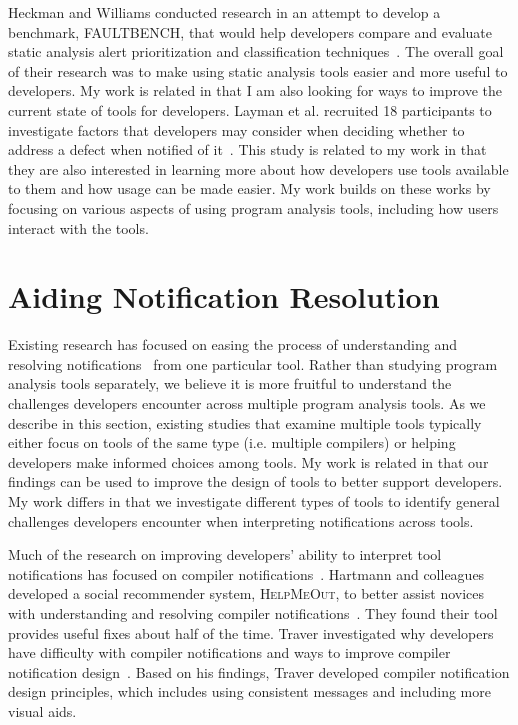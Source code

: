 Heckman and Williams conducted research in an attempt to develop a benchmark,
FAULTBENCH, that would help developers compare and evaluate static analysis
alert prioritization and classification techniques~\cite{Heckman:2008:Faultbench}. 
The overall goal of their research was to make using static analysis tools easier and more useful to developers.
My work is related in that I am also looking for ways to improve the current state of tools for developers. 
Layman et al. recruited 18 participants to investigate factors that developers may consider when deciding whether to
address a defect when notified of it~\cite{Layman:2007:FaultFix}. This study
is related to my work in that they are also interested in learning more about how developers use tools available to them 
and how usage can be made easier.  My work builds on these works by focusing on various
aspects of using program analysis tools, including how users interact with the
tools.

\section{Aiding Notification Resolution}

Existing research has focused on easing the process of understanding and resolving notifications~\cite{Hartmann:2010:Suggestions,Mucslu:2012:Speculative,pham2015automatically,fritz2014developers} from one particular tool.
Rather than studying program analysis tools separately, we believe it is more fruitful to understand the challenges developers encounter across multiple program analysis tools.
As we describe in this section,
existing studies that examine multiple tools typically either focus on tools of the same type (i.e. multiple compilers) 
or helping developers make informed choices among tools. 
My work is related in that our findings can be used to improve the design of tools to better support developers.
My work differs in that we investigate different types of tools to identify general challenges developers encounter when interpreting notifications across tools. 

Much of the research on improving developers' ability to interpret tool notifications has focused on compiler notifications~\cite{Hartmann:2010:Suggestions,Traver:2010:Messages,barik14}. 
Hartmann and colleagues developed a social recommender system, \textsc{HelpMeOut}, to better assist novices with understanding and resolving compiler notifications~\cite{Hartmann:2010:Suggestions}. They found their tool provides useful fixes about half of the time. Traver investigated why developers have difficulty with compiler notifications and ways to improve compiler notification design~\cite{Traver:2010:Messages}. Based on his findings, Traver developed compiler notification design principles, which includes using consistent messages and including more visual aids.

